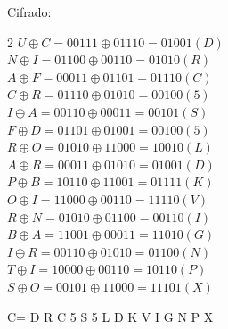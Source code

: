 \documentclass{article}
\begin{document}
\begin{enumerate}
Cifrado:
\begin{multicols}{2}
$ U \oplus C = 00111 \oplus 01110 = 01001 (D)$ \\
$ N \oplus I = 01100 \oplus 00110 = 01010 (R)$ \\
$ A \oplus F = 00011 \oplus 01101 = 01110 (C)$ \\
$ C \oplus R = 01110 \oplus 01010 = 00100 (5)$ \\
$ I \oplus A = 00110 \oplus 00011 = 00101 (S)$ \\
$ F \oplus D = 01101 \oplus 01001 = 00100 (5)$ \\
$ R \oplus O = 01010 \oplus 11000 = 10010 (L)$ \\
$ A \oplus R = 00011 \oplus 01010 = 01001 (D)$ \\
$ P \oplus B = 10110 \oplus 11001 = 01111 (K)$ \\
$ O \oplus I = 11000 \oplus 00110 = 11110 (V)$ \\
$ R \oplus N= 01010 \oplus 01100 = 00110 (I)$ \\
$ B \oplus A= 11001 \oplus 00011 = 11010 (G)$ \\
$ I \oplus R= 00110 \oplus 01010 = 01100 (N)$ \\
$ T \oplus I= 10000 \oplus 00110 = 10110 (P)$ \\
$ S \oplus O= 00101 \oplus 11000 = 11101 (X)$ \\
\end{multicols}

C=  D R C 5 S 5 L D K V I G N P X



\end{enumerate}
\end{document}
